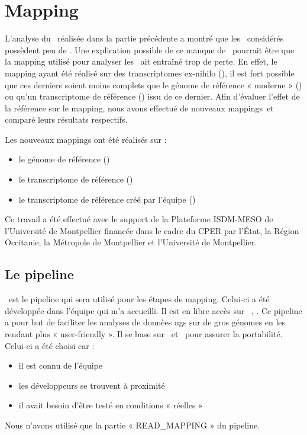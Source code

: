 \documentclass[../main]{subfiles} %
\begin{document}
\addto\extrasfrench{\protected\edef:{\unexpanded\expandafter{:}}}

\section{Mapping}
\label{sec:Mapping}
L’analyse du \NbSNP réalisée dans la partie précédente a montré que les \contigs considérés possèdent peu de \SNP. Une explication possible de  ce manque de \SNP pourrait être que la \gls{mapping} utilisé pour analyser les \contigs ait entraîné trop de perte. En effet, le \gls{mapping} ayant été réalisé sur des transcriptomes ex-nihilo (\TrEx), il est fort possible que ces derniers soient moins complets que le génome de référence « moderne »  (\GeMo) ou qu’un transcriptome de référence (\TrMo) issu de ce dernier. Afin d’évaluer l’effet de la référence sur le \gls{mapping}, nous avons effectué de nouveaux \glspl{mapping} et comparé leurs résultats respectifs.

Les nouveaux  \glspl{mapping} ont été réalisés sur :
\begin{itemize}
\item le génome de référence (\GeMo)
\item le transcriptome de référence (\TrMo)
\item le transcriptome de référence créé par l'équipe (\TrEx)
\end{itemize}

Ce travail a été effectué avec le support de la Plateforme ISDM-MESO de l’Université de Montpellier financée dans le cadre du CPER par l’État, la Région Occitanie, la Métropole de Montpellier et l’Université de Montpellier.




\subsection{Le pipeline}
\label{sec:GeCKO}
\GeCKO est le pipeline qui sera utilisé pour les étapes de \gls{mapping}. Celui-ci a été développée dans l’équipe qui m’a accueilli. Il est en libre accès sur \GitHub \cite{noauthor_ge2popgecko_2024}, \cite{ardisson_gecko_2024}. Ce pipeline a pour but de faciliter les analyses de donnèes \acrshort{ngs} sur de gros génomes en les rendant plus « user-friendly ». Il se base sur \Conda et \SnakeMake pour assurer la portabilité. Celui-ci a été choisi car :
\begin{itemize}
\item il est connu de l’équipe
\item les développeurs se trouvent à proximité
\item il avait besoin d’être testé en conditions « réelles »
\end{itemize}
Nous n’avons utilisé que la partie « READ\_MAPPING » du pipeline.
\end{document}

